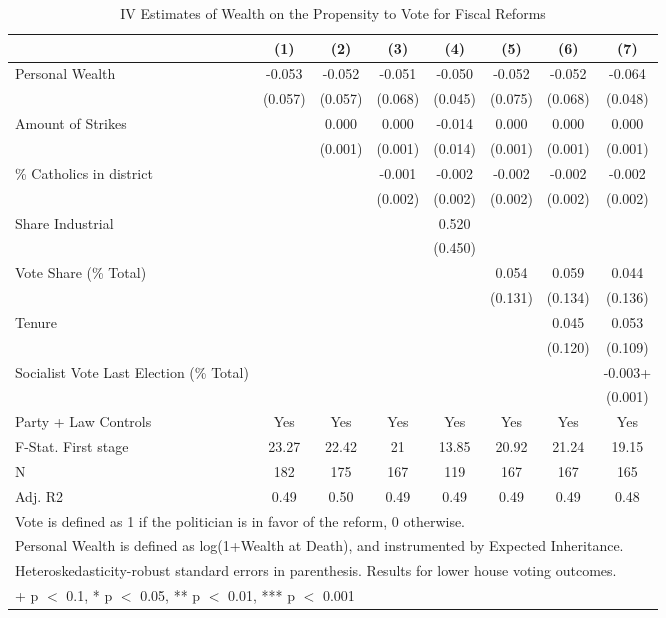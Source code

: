 \begin{table}

\caption{\label{tab:ivresults}IV Estimates of Wealth on the Propensity to Vote for Fiscal Reforms}
\centering
\begin{tabular}[t]{lccccccc}
\toprule
  & (1) & (2) & (3) & (4) & (5) & (6) & (7)\\
\midrule
Personal Wealth & -0.053 & -0.052 & -0.051 & -0.050 & -0.052 & -0.052 & -0.064\\
 & (0.057) & (0.057) & (0.068) & (0.045) & (0.075) & (0.068) & (0.048)\\
Amount of Strikes &  & 0.000 & 0.000 & -0.014 & 0.000 & 0.000 & 0.000\\
 &  & (0.001) & (0.001) & (0.014) & (0.001) & (0.001) & (0.001)\\
\% Catholics in district &  &  & -0.001 & -0.002 & -0.002 & -0.002 & -0.002\\
 &  &  & (0.002) & (0.002) & (0.002) & (0.002) & (0.002)\\
Share Industrial &  &  &  & 0.520 &  &  & \\
 &  &  &  & (0.450) &  &  & \\
Vote Share (\% Total) &  &  &  &  & 0.054 & 0.059 & 0.044\\
 &  &  &  &  & (0.131) & (0.134) & (0.136)\\
Tenure &  &  &  &  &  & 0.045 & 0.053\\
 &  &  &  &  &  & (0.120) & (0.109)\\
Socialist Vote Last Election (\% Total) &  &  &  &  &  &  & -0.003+\\
 &  &  &  &  &  &  & (0.001)\\
\midrule
Party + Law Controls & Yes & Yes & Yes & Yes & Yes & Yes & Yes\\
F-Stat. First stage & 23.27 & 22.42 & 21 & 13.85 & 20.92 & 21.24 & 19.15\\
N & 182 & 175 & 167 & 119 & 167 & 167 & 165\\
Adj. R2 & 0.49 & 0.50 & 0.49 & 0.49 & 0.49 & 0.49 & 0.48\\
\bottomrule
\multicolumn{8}{l}{\rule{0pt}{1em}Vote is defined as 1 if the politician is in favor of the reform, 0 otherwise.}\\
\multicolumn{8}{l}{\rule{0pt}{1em}Personal Wealth is defined as log(1+Wealth at Death), and instrumented by Expected Inheritance.}\\
\multicolumn{8}{l}{\rule{0pt}{1em}Heteroskedasticity-robust standard errors in parenthesis. Results for lower house voting outcomes.}\\
\multicolumn{8}{l}{\rule{0pt}{1em}+ p $<$ 0.1, * p $<$ 0.05, ** p $<$ 0.01, *** p $<$ 0.001}\\
\end{tabular}
\end{table}

